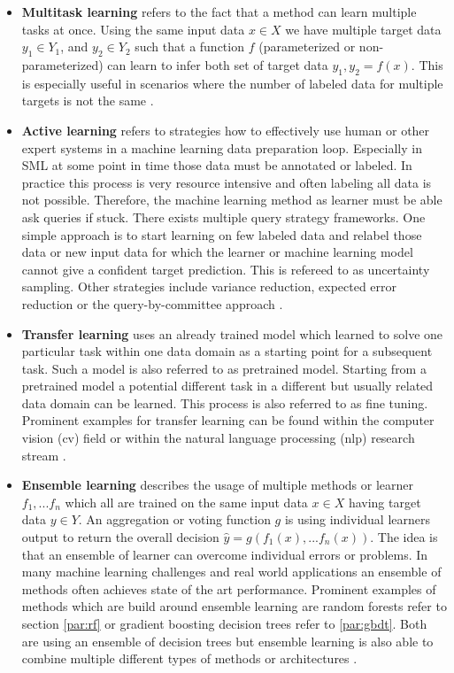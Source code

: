 \documentclass[../main.tex]{subfiles}
\begin{document}
\begin{itemize}
    \item \textbf{Multitask learning} refers to the fact that a method can learn multiple tasks at once. Using the same input data $x \in X$ we have multiple target data $y_1 \in Y_1$, and $y_2 \in Y_2$ such that a function $f$ (parameterized or non-parameterized) can learn to infer both set of target data $y_1, y_2 = f(x)$. This is especially useful in scenarios where the number of labeled data for multiple targets is not the same \cite[p.~244]{Goodfellow-et-al-2016}.
    
    \item \textbf{Active learning} refers to strategies how to effectively use  human or other expert systems in a machine learning data preparation loop. Especially in SML at some point in time those data must be annotated or labeled. In practice this process is very resource intensive and often labeling all data is not possible. Therefore, the machine learning method as learner must be able ask queries if stuck. There exists multiple query strategy frameworks. One simple approach is to start learning on few labeled data and relabel those data or new input data for which the learner or machine learning model cannot give a confident target prediction. This is refereed to as uncertainty sampling. Other strategies include variance reduction, expected error reduction or the query-by-committee approach \cite{settles_active_2009}.
    
    \item \textbf{Transfer learning} uses an already trained model which learned to solve one particular task within one data domain as a starting point for a subsequent task. Such a model is also referred to as pretrained model. Starting from a pretrained model a potential different task in a different but usually related data domain can be learned. This process is also referred to as fine tuning. Prominent examples for transfer learning can be found within the computer vision (\acs{cv}) field or within the natural language processing (\acs{nlp}) research stream \cite{zhuang_comprehensive_2020}.

    \item \textbf{Ensemble learning} describes the usage of multiple methods or learner $f_1,...f_n$ which all are trained on the same input data $x \in X$ having target data $y \in Y$. An aggregation or voting function $g$ is using individual learners output to return the overall decision $\hat{y}=g(f_1(x),...f_n(x))$. The idea is that an ensemble of learner can overcome individual errors or problems. In many machine learning challenges and real world applications an ensemble of methods often achieves state of the art performance. Prominent examples of methods which are build around ensemble learning are random forests refer to section \ref{par:rf} or gradient boosting decision trees refer to \ref{par:gbdt}. Both are using an ensemble of decision trees but ensemble learning is also able to combine multiple different types of methods or architectures \cite{sagi_ensemble_2018}.
\end{itemize}
\end{document}
